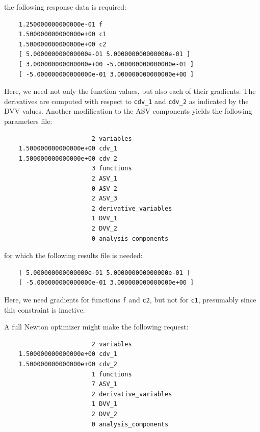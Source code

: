 the following response data is required:
\begin{small}
\begin{verbatim}
    1.250000000000000e-01 f
    1.500000000000000e+00 c1
    1.500000000000000e+00 c2
    [ 5.000000000000000e-01 5.000000000000000e-01 ]
    [ 3.000000000000000e+00 -5.000000000000000e-01 ]
    [ -5.000000000000000e-01 3.000000000000000e+00 ]
\end{verbatim}
\end{small}
Here, we need not only the function values, but also each of their
gradients. The derivatives are computed with respect to \texttt{cdv\_1}
and \texttt{cdv\_2} as indicated by the DVV values. Another modification
to the ASV components yields the following parameters file:
\begin{small}
\begin{verbatim}
                        2 variables
    1.500000000000000e+00 cdv_1
    1.500000000000000e+00 cdv_2
                        3 functions
                        2 ASV_1
                        0 ASV_2
                        2 ASV_3
                        2 derivative_variables
                        1 DVV_1
                        2 DVV_2
                        0 analysis_components
\end{verbatim}
\end{small}

for which the following results file is needed:
\begin{small}
\begin{verbatim}
    [ 5.000000000000000e-01 5.000000000000000e-01 ]
    [ -5.000000000000000e-01 3.000000000000000e+00 ]
\end{verbatim}
\end{small}
Here, we need gradients for functions \texttt{f} and \texttt{c2}, but
not for \texttt{c1}, presumably since this constraint is inactive.

A full Newton optimizer might make the following request:
\begin{small}
\begin{verbatim}
                        2 variables
    1.500000000000000e+00 cdv_1
    1.500000000000000e+00 cdv_2
                        1 functions
                        7 ASV_1
                        2 derivative_variables
                        1 DVV_1
                        2 DVV_2
                        0 analysis_components
\end{verbatim}
\end{small}

